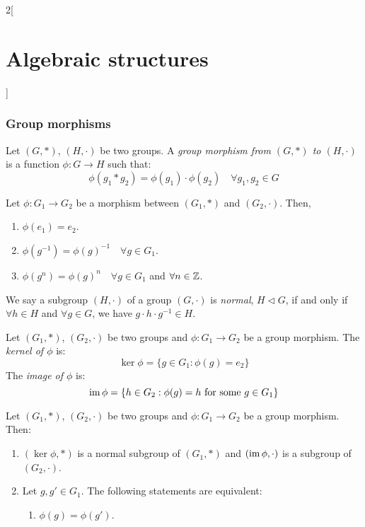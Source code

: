 \documentclass[../../../main.tex]{subfiles}
\begin{document}
\begin{multicols}{2}[\section{Algebraic structures}]
    \subsubsection{Group morphisms}
    \begin{definition}\label{AS-groupmorphism}
        Let $(G,*)$, $(H,\cdot)$ be two groups. A \textit{group morphism from $(G,*)$ to $(H,\cdot)$} is a function $\phi:G\rightarrow H$ such that: $$\phi(g_1*g_2)=\phi(g_1)\cdot\phi(g_2)\quad\forall g_1,g_2\in G$$
    \end{definition}
    \begin{lemma}
        Let $\phi:G_1\rightarrow G_2$ be a morphism between $(G_1,*)$ and $(G_2,\cdot)$. Then,
        \begin{enumerate}
            \item $\phi(e_1)=e_2$.
            \item $\phi(g^{-1})=\phi(g)^{-1}\quad\forall g\in G_1$.
            \item $\phi(g^n)=\phi(g)^n\quad\forall g\in G_1$ and $\forall n\in\mathbb{Z} $.
        \end{enumerate}
    \end{lemma}
    \begin{definition}
        We say a subgroup $(H,\cdot)$ of a group $(G,\cdot)$ is \textit{normal}, $H\lhd G$, if and only if $\forall h\in H$ and $\forall g\in G$, we have $g\cdot h\cdot g^{-1}\in H$.
    \end{definition}
    \begin{definition}
        Let $(G_1,*)$, $(G_2,\cdot)$ be two groups and $\phi:G_1\rightarrow G_2$ be a group morphism. The \textit{kernel of $\phi$} is: $$\ker\phi=\{g\in G_1:\phi(g)=e_2\}$$
        The \textit{image of $\phi$} is: $$\operatorname{im}\phi=\{h\in G_2:\phi(g)=h\text{ for some }g\in G_1\}$$
    \end{definition}
    \begin{prop}
        Let $(G_1,*)$, $(G_2,\cdot)$ be two groups and $\phi:G_1\rightarrow G_2$ be a group morphism. Then:
        \begin{enumerate}
            \item $(\ker\phi,*)$ is a normal subgroup of $(G_1,*)$ and $(\operatorname{im}\phi,\cdot)$ is a subgroup of $(G_2,\cdot)$.
            \item Let $g,g'\in G_1$. The following statements are equivalent:
                  \begin{enumerate}
                      \item $\phi(g)=\phi(g')$.

\end{enumerate}
\end{enumerate}
\end{prop}
\end{multicols}
\end{document}
